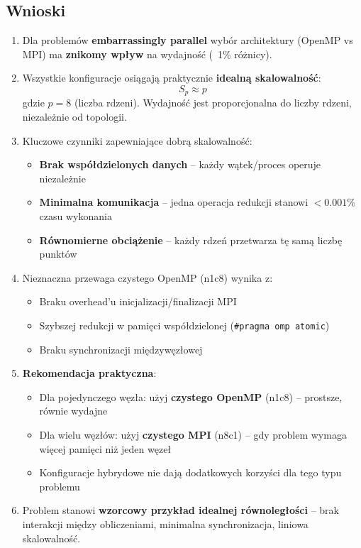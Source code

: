 \subsection{Wnioski}

\begin{enumerate}
    \item Dla problemów \textbf{embarrassingly parallel} wybór architektury (OpenMP vs MPI) ma \textbf{znikomy wpływ} na wydajność (~1\% różnicy).
    
    \item Wszystkie konfiguracje osiągają praktycznie \textbf{idealną skalowalność}:
    \begin{equation}
        S_p \approx p
    \end{equation}
    gdzie $p=8$ (liczba rdzeni). Wydajność jest proporcjonalna do liczby rdzeni, niezależnie od topologii.
    
    \item Kluczowe czynniki zapewniające dobrą skalowalność:
    \begin{itemize}
        \item \textbf{Brak współdzielonych danych} -- każdy wątek/proces operuje niezależnie
        \item \textbf{Minimalna komunikacja} -- jedna operacja redukcji stanowi $< 0.001\%$ czasu wykonania
        \item \textbf{Równomierne obciążenie} -- każdy rdzeń przetwarza tę samą liczbę punktów
    \end{itemize}
    
    \item Nieznaczna przewaga czystego OpenMP (n1c8) wynika z:
    \begin{itemize}
        \item Braku overhead'u inicjalizacji/finalizacji MPI
        \item Szybszej redukcji w pamięci współdzielonej (\texttt{\#pragma omp atomic})
        \item Braku synchronizacji międzywęzłowej
    \end{itemize}
    
    \item \textbf{Rekomendacja praktyczna}:
    \begin{itemize}
        \item Dla pojedynczego węzła: użyj \textbf{czystego OpenMP} (n1c8) -- prostsze, równie wydajne
        \item Dla wielu węzłów: użyj \textbf{czystego MPI} (n8c1) -- gdy problem wymaga więcej pamięci niż jeden węzeł
        \item Konfiguracje hybrydowe nie dają dodatkowych korzyści dla tego typu problemu
    \end{itemize}
    
    \item Problem stanowi \textbf{wzorcowy przykład idealnej równoległości} -- brak interakcji między obliczeniami, minimalna synchronizacja, liniowa skalowalność.
\end{enumerate}
